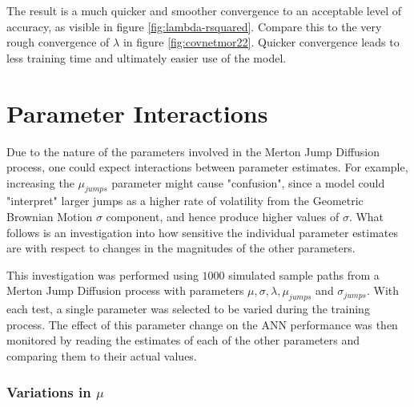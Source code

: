 \documentclass[11pt,oneside,openany,a4paper,english, report, goldenblock
]{usthesis}
\begin{document}
The result is a much quicker and smoother convergence to an acceptable level of accuracy, as visible in figure \ref{fig:lambda-rsquared}. Compare this to the very rough convergence of $\lambda$ in figure \ref{fig:covnetmor22}. Quicker convergence leads to less training time and ultimately easier use of the model.

\section{Parameter Interactions}
Due to the nature of the parameters involved in the Merton Jump Diffusion process, one could expect interactions between parameter estimates. For example, increasing the $\mu_{jumps}$ parameter might cause "confusion", since a model could "interpret" larger jumps as a higher rate of volatility from the Geometric Brownian Motion $\sigma$ component, and hence produce higher values of $\sigma$. What follows is an investigation into how sensitive the individual parameter estimates are with respect to changes in the magnitudes of the other parameters. 

This investigation was performed using $1000$ simulated sample paths from a Merton Jump Diffusion process with parameters $\mu, \sigma, \lambda, \mu_{jumps}$ and $\sigma_{jumps}$. With each test, a single parameter was selected to be varied during the training process. The effect of this parameter change on the ANN performance was then monitored by reading the estimates of each of the other parameters and comparing them to their actual values.

\subsubsection{Variations in $\mu$}
\end{document}

